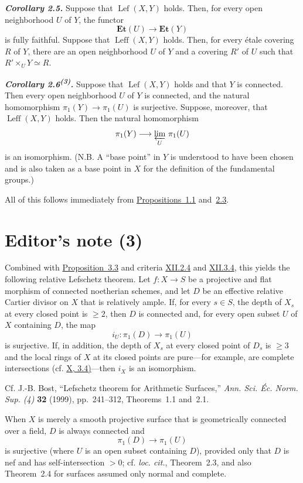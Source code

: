 \documentclass[11pt,a4paper,oneside]{book}
\providecommand{\Etc}{\mathbf{Et}}
\providecommand{\Lefc}{\operatorname{Lef}}
\providecommand{\Leffc}{\operatorname{Leff}}
\theoremstyle{plain}
\theoremstyle{definition}
\theoremstyle{remark}
\begin{document}
\medskip
{}\noindent\textbf{\textit{Corollary 2.5.}}
Suppose that $\Lefc(X,Y)$ holds. Then, for every open neighborhood $U$ of
$Y$, the functor
\[
  \Etc(U)\longrightarrow\Etc(Y)
\]
is fully faithful. Suppose that $\Leffc(X,Y)$ holds. Then, for every
\'{e}tale covering $R$ of $Y$, there are an open neighborhood $U$ of $Y$
and a covering $R'$ of $U$ such that
$R'\times_U Y\simeq R$.

\medskip
{}\noindent\textbf{\textit{Corollary 2.6\textsuperscript{(3)}.}}
Suppose that $\Lefc(X,Y)$ holds and that $Y$ is connected. Then every open
neighborhood $U$ of $Y$ is connected, and the natural homomorphism
$\pi_1(Y)\longrightarrow\pi_1(U)$ is surjective. Suppose, moreover, that
$\Leffc(X,Y)$ holds. Then the natural homomorphism
\[
  \pi_1(Y)\longrightarrow\varprojlim_{U}\,\pi_1(U)
\]
is an isomorphism. (N.B. A ``base point'' in $Y$ is understood to have been
chosen and is also taken as a base point in $X$ for the definition of the
fundamental groups.)

\medskip
\noindent All of this follows immediately from \hyperref[X.1.1]{Propositions~1.1} and~\hyperref[X.2.3]{2.3}.

\section*{Editor's note (3)}
Combined with \hyperref[X.3.3]{Proposition~3.3} and criteria \hyperref[XII.2.4]{XII.2.4} and \hyperref[XII.3.4]{XII.3.4}, this yields the
following relative Lefschetz theorem. Let $f\colon X\to S$ be a projective and
flat morphism of connected noetherian schemes, and let $D$ be an effective
relative Cartier divisor on $X$ that is relatively ample. If, for every
$s\in S$, the depth of $X_s$ at every closed point is $\geq 2$, then $D$ is
connected and, for every open subset $U$ of $X$ containing $D$, the map
\[
  i_U\colon \pi_1(D)\longrightarrow\pi_1(U)
\]
is surjective. If, in addition, the depth of $X_s$ at every closed point of
$D_s$ is $\geq 3$ and the local rings of $X$ at its closed points are
pure---for example, are complete intersections (cf. \hyperref[X.3.4]{X, 3.4)}---then $i_X$ is an
isomorphism.

Cf. J.-B. Bost, ``Lefschetz theorem for Arithmetic Surfaces,''
\emph{Ann. Sci. \'Ec. Norm. Sup. (4)} \textbf{32} (1999), pp.~241--312,
Theorems~1.1 and~2.1.

When $X$ is merely a smooth projective surface that is geometrically connected
over a field, $D$ is always connected and
\[
  \pi_1(D)\longrightarrow\pi_1(U)
\]
is surjective (where $U$ is an open subset containing $D$), provided only that
$D$ is nef and has self-intersection $>0$; cf. \emph{loc. cit.}, Theorem~2.3,
and also Theorem~2.4 for surfaces assumed only normal and complete.
\end{document}
